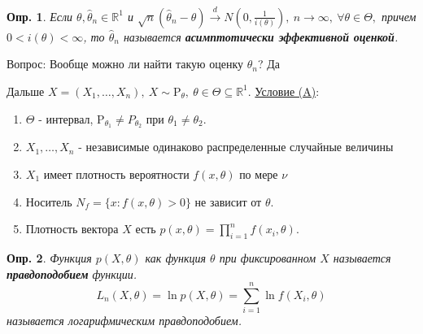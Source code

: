 \documentclass[12pt]{article}
\newtheorem{definition}{Опр.}
\theoremstyle{basic_theorem}
\theoremstyle{name_theorem}
\newcommand\defin[1]{\textbf{#1}}
\def\R{
    \mathbb{R}
}
\def\P{
    \mathrm{P}
}
\begin{document}
    \begin{definition}
        Если $\theta, \widehat{\theta}_n \in \R^1$ и $\sqrt{n}(\widehat{\theta}_n - \theta)\xrightarrow{d} N(0, \frac{1}{i(\theta)}),
        \ n \rightarrow \infty, \ \forall \theta \in \Theta,$
        причем $0 < i(\theta) < \infty$, то $\widehat{\theta}_n$ называется \defin{асимптотически 
        эффективной оценкой}.
    \end{definition}
    Вопрос: Вообще можно ли найти такую оценку $\widehat{\theta}_n$? Да
    
    \newpage
    
    Дальше $X = (X_1, \ldots, X_n), \ X \sim \P_\theta,\ \theta \in \Theta \subseteq \R^1$.
    \underline{Условие (A)}:
    \begin{enumerate}
        \item $\Theta$ - интервал, $\P_{\theta_1} \neq P_{\theta_2}$ при $\theta_1 \neq \theta_2$.
        \item $X_1, \ldots, X_n$ - независимые одинаково распределенные случайные величины
        \item $X_1$ имеет плотность вероятности $f(x, \theta)$ по мере $\nu$
        \item Носитель $N_f = \{x: f(x, \theta) > 0\}$ не зависит от $\theta$.
        \item Плотность вектора $X$ есть $p(x, \theta) = \prod_{i=1}^n f(x_i, \theta)$.
    \end{enumerate}
    \begin{definition}
    Функция $p(X, \theta)$ как функция $\theta$ при фиксированном $X$ называется
    \defin{правдоподобием} функции.
    $$L_n(X, \theta) = \ln p(X, \theta) = \sum_{i=1}^n \ln f(X_i, \theta)$$ 
    называется логарифмическим правдоподобием.
    \end{definition}
\end{document}
